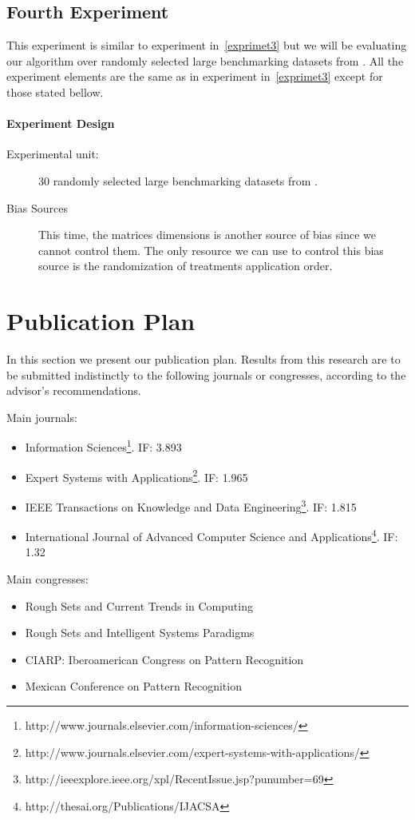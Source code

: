 \documentclass[11pt]{article}   %
\begin{document}
 \subsection{Fourth Experiment}\label{exprimet4}
  This experiment is similar to experiment in~\ref{exprimet3} but we will be evaluating our algorithm over 
  randomly selected large benchmarking datasets from \cite{Bache13}. All the experiment elements are the
  same as in experiment in~\ref{exprimet3} except for those stated bellow.
  \paragraph{Experiment Design} 
	  \begin{description}
	  	\item[Experimental unit:] 30 randomly selected large benchmarking datasets from \cite{Bache13}.
	  	\item[Bias Sources] This time, the matrices dimensions is another source of bias since we cannot 
	  						control them. The only resource we can use to control this bias source is the
	  						randomization of treatments application order.
	  \end{description}
	  	
\section{Publication Plan}\label{PubPlan}
  In this section we present our publication plan. Results from this research are to be submitted indistinctly 
  to the following journals or congresses, according to the advisor’s recommendations.
  
  Main journals:
  \begin{itemize}
 	\item Information Sciences\footnote{http://www.journals.elsevier.com/information-sciences/}. IF: 3.893
 	\item Expert Systems with 
 		  Applications\footnote{http://www.journals.elsevier.com/expert-systems-with-applications/}. IF: 1.965
 	\item IEEE Transactions on Knowledge and Data
 		  Engineering\footnote{http://ieeexplore.ieee.org/xpl/RecentIssue.jsp?punumber=69}. IF: 1.815
 	\item International Journal of Advanced Computer Science and
 		  Applications\footnote{http://thesai.org/Publications/IJACSA}. IF: 1.32
  \end{itemize}
 
  Main congresses:
  \begin{itemize}
 	\item Rough Sets and Current Trends in Computing
 	\item Rough Sets and Intelligent Systems Paradigms
 	\item CIARP: Iberoamerican Congress on Pattern Recognition
 	\item Mexican Conference on Pattern Recognition
  \end{itemize}
  
\end{document}

